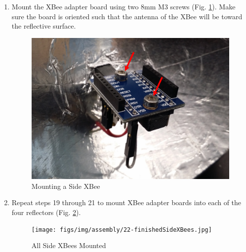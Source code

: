 \begin{enumerate}[label = \textbf{Step \arabic*.}]
    \item Mount the XBee adapter board using two 8mm M3 screws (Fig. \ref{fig:sideXBeeMounting}). Make sure the board is oriented such that the antenna of the XBee will be toward the reflective surface.
    \begin{figure}[H]
        \centering
        \includegraphics[width=4.2in]{figs/img/assembly/21-sideXBeeMounting.png}
        \caption{Mounting a Side XBee}
        \label{fig:sideXBeeMounting}
    \end{figure}
    \pagebreak

    \item Repeat steps 19 through 21 to mount XBee adapter boards into each of the four reflectors (Fig. \ref{fig:finishedSideXBees}).
    \begin{figure}[H]
        \centering
        \texttt{[image: figs/img/assembly/22-finishedSideXBees.jpg]}
        \caption{All Side XBees Mounted}
        \label{fig:finishedSideXBees}
    \end{figure}


\end{enumerate}
